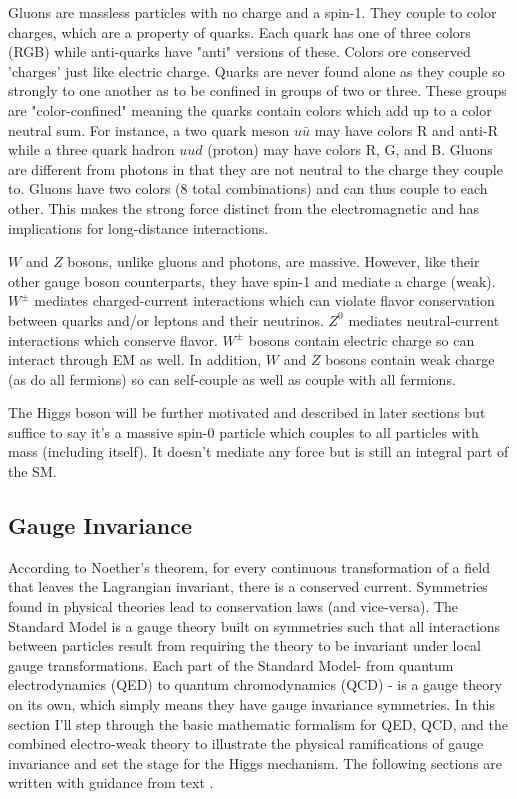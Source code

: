 Gluons are massless particles with no charge and a spin-1. They couple to color charges, which are a property of quarks. Each quark has one of three colors (RGB) while anti-quarks have "anti" versions of these. Colors ore conserved 'charges' just like electric charge. Quarks are never found alone as they couple so strongly to one another as to be confined in groups of two or three. These groups are "color-confined" meaning the quarks contain colors which add up to a color neutral sum. For instance, a two quark meson $u\bar{u}$ may have colors R and anti-R while a three quark hadron $uud$ (proton) may have colors R, G, and B. Gluons are different from photons in that they are not neutral to the charge they couple to. Gluons have two colors (8 total combinations) and can thus couple to each other. This makes the strong force distinct from the electromagnetic and has implications for long-distance interactions.
 
$W$ and $Z$ bosons, unlike gluons and photons, are massive. However, like their other gauge boson counterparts, they have spin-1 and mediate a charge (weak). $W^{\pm}$ mediates charged-current interactions which can violate flavor conservation between quarks and/or leptons and their neutrinos. $Z^{0}$ mediates neutral-current interactions which conserve flavor. $W^{\pm}$ bosons contain electric charge so can interact through EM as well. In addition, $W$ and $Z$ bosons contain weak charge (as do all fermions) so can self-couple as well as couple with all fermions. 
 
The Higgs boson will be further motivated and described in later sections but suffice to say it's a massive spin-0 particle which couples to all particles with mass (including itself). It doesn't mediate any force but is still an integral part of the SM.  

\subsection{Gauge Invariance}
According to Noether's theorem, for every continuous transformation of a field that leaves the Lagrangian invariant, there is a conserved current. Symmetries found in physical theories lead to conservation laws (and vice-versa). The Standard Model is a gauge theory built on symmetries such that all interactions between particles result from requiring the theory to be invariant under local gauge transformations. Each part of the Standard Model- from quantum electrodynamics (QED) to quantum chromodynamics (QCD) - is a gauge theory on its own, which simply means they have gauge invariance symmetries. In this section I'll step through the basic mathematic formalism for QED, QCD, and the combined electro-weak theory to illustrate the physical ramifications of gauge invariance and set the stage for the Higgs mechanism. The following sections are written with guidance from text \cite{HalzenMartin}. 

